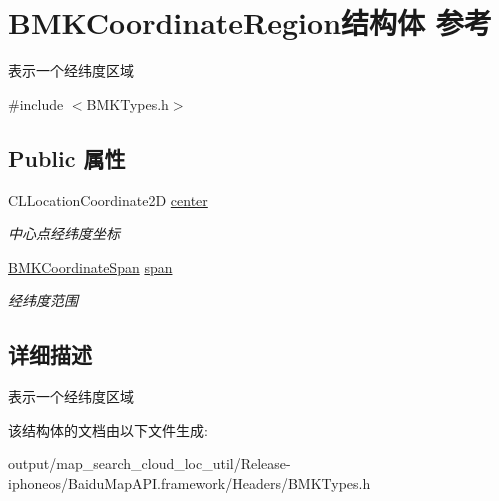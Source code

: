 \hypertarget{struct_b_m_k_coordinate_region}{}\section{B\+M\+K\+Coordinate\+Region结构体 参考}
\label{struct_b_m_k_coordinate_region}


表示一个经纬度区域  




{\ttfamily \#include $<$B\+M\+K\+Types.\+h$>$}

\subsection*{Public 属性}
\begin{DoxyCompactItemize}
\item 
\hypertarget{struct_b_m_k_coordinate_region_a298c069df033a5690fdebc3c63f86903}{}C\+L\+Location\+Coordinate2\+D \hyperlink{struct_b_m_k_coordinate_region_a298c069df033a5690fdebc3c63f86903}{center}\label{struct_b_m_k_coordinate_region_a298c069df033a5690fdebc3c63f86903}

\begin{DoxyCompactList}\small\item\em 中心点经纬度坐标 \end{DoxyCompactList}\item 
\hypertarget{struct_b_m_k_coordinate_region_a75e65758cbbf7cb3ed6007d4ce301292}{}\hyperlink{struct_b_m_k_coordinate_span}{B\+M\+K\+Coordinate\+Span} \hyperlink{struct_b_m_k_coordinate_region_a75e65758cbbf7cb3ed6007d4ce301292}{span}\label{struct_b_m_k_coordinate_region_a75e65758cbbf7cb3ed6007d4ce301292}

\begin{DoxyCompactList}\small\item\em 经纬度范围 \end{DoxyCompactList}\end{DoxyCompactItemize}


\subsection{详细描述}
表示一个经纬度区域 

该结构体的文档由以下文件生成\+:\begin{DoxyCompactItemize}
\item 
output/map\+\_\+search\+\_\+cloud\+\_\+loc\+\_\+util/\+Release-\/iphoneos/\+Baidu\+Map\+A\+P\+I.\+framework/\+Headers/B\+M\+K\+Types.\+h\end{DoxyCompactItemize}
